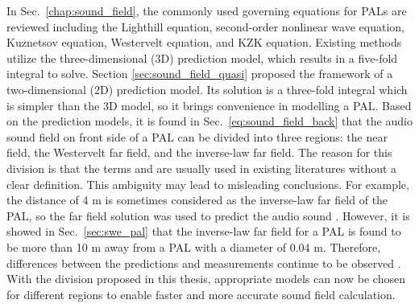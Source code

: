 {
    In Sec.~\ref{chap:sound_field}, the commonly used governing equations for PALs are reviewed including the Lighthill equation, second-order nonlinear wave equation, Kuznetsov equation, Westervelt equation, and KZK equation.
    Existing methods utilize the three-dimensional (3D) prediction model, which results in a five-fold integral to solve.
    Section \ref{sec:sound_field_quasi} proposed the framework of a two-dimensional (2D) prediction model.
    Its solution is a three-fold integral which is simpler than the 3D model, so it brings convenience in modelling a PAL.
    Based on the prediction models, it is found in Sec.~\ref{eq:sound_field_back} that the audio sound field on front side of a PAL can  be divided into three regions: the near field, the Westervelt far field, and the inverse-law far field.
    The reason for this division is that the terms  and  are usually used in existing literatures without a clear definition.
    This ambiguity may lead to misleading conclusions. 
    For example, the distance of 4 m is sometimes considered as the inverse-law far field of the PAL, so the far field solution was used to predict the audio sound \cite{Shi2015ConvolutionModelComputing}.
    However, it is showed in Sec.~\ref{sec:swe_pal} that 
    the inverse-law far field for a PAL is found to be more than 10 m away from a PAL with a diameter of 0.04 m.
    Therefore, differences between the predictions and measurements continue to be observed \cite{Shi2015ConvolutionModelComputing}.
    With the division proposed in this thesis, appropriate models can now be chosen for different regions to enable faster and more accurate sound field calculation. 
}

